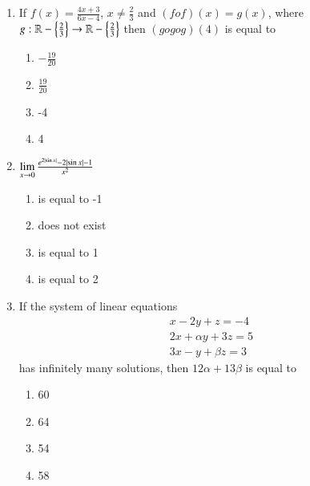 \documentclass[journal]{IEEEtran}
\begin{document}
\begin{enumerate}
    \item If $f(x) = \frac{4x+3}{6x-4}$, $x \ne \frac{2}{3}$ and
    $(fof)(x) = g(x)$, where $g:\mathbb{R} - \left\{\frac{2}{3}\right\} \to
    \mathbb{R} - \left\{\frac{2}{3}\right\}$ then $(gogog)(4)$ is equal to
    
    \begin{multicols}{4}
\begin{enumerate}

        \item $-\frac{19}{20}$
        \item $\frac{19}{20}$
        \item -4
        \item 4
    \end{enumerate}
\end{multicols}

    \item $\lim\limits_{x \to 0} \frac{e^{2\left\vert\sin x\right\vert} - 2\left\vert\sin x\right\vert - 1}{x^2}$
    
    \begin{multicols}{4}
\begin{enumerate}

        \item is equal to -1 
        \item does not exist
        \item is equal to 1 
        \item is equal to 2 
    \end{enumerate}
\end{multicols}

    \item If the system of linear equations
    \begin{align*}
        x - 2y + z = -4 \\
        2x + \alpha y + 3z = 5 \\
        3x - y + \beta z = 3
    \end{align*}
    has infinitely many solutions, then $12\alpha + 13\beta$ is equal to

    \begin{multicols}{4}
\begin{enumerate}

        \item 60
        \item 64
        \item 54
        \item 58
    \end{enumerate}
\end{multicols}


\end{enumerate}
\end{document}
